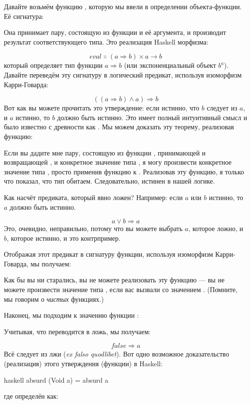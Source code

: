 Давайте возьмём функцию , которую мы ввели в
определении объекта-функции. Её сигнатура:

Она принимает пару, состоящую из функции и её аргумента, и производит
результат соответствующего типа. Это реализация Haskell
морфизма:

\[\mathit{eval} \Colon (a \Rightarrow b) \times a \to b\]
который определяет тип функции $a \Rightarrow b$ (или экспоненциальный объект
$b^{a}$). Давайте переведём эту сигнатуру в логический предикат,
используя изоморфизм Карри-Говарда:

\[((a \Rightarrow b) \wedge a) \Rightarrow b\]
Вот как вы можете прочитать это утверждение: если истинно, что $b$
следует из $a$, и $a$ истинно, то $b$ должно быть
истинно. Это имеет полный интуитивный смысл и было известно с
древности как . Мы можем доказать эту теорему,
реализовав функцию:

Если вы дадите мне пару, состоящую из функции , принимающей
 и возвращающей , и конкретное значение 
типа , я могу произвести конкретное значение типа ,
просто применив функцию  к . Реализовав
эту функцию, я только что показал, что тип
 обитаем.
Следовательно,  истинен в нашей логике.

Как насчёт предиката, который явно ложен? Например: если
$a$ или $b$ истинно, то $a$ должно быть истинно.

\[a \vee b \Rightarrow a\]
Это, очевидно, неправильно, потому что вы можете выбрать $a$, которое
ложно, и $b$, которое истинно, и это контрпример.

Отображая этот предикат в сигнатуру функции, используя изоморфизм Карри-Говарда,
мы получаем:

Как бы вы ни старались, вы не можете реализовать эту функцию --- вы не можете произвести
значение типа , если вас вызвали со значением .
(Помните, мы говорим о \emph{чистых} функциях.)

Наконец, мы подходим к значению функции :

Учитывая, что  переводится в ложь, мы получаем:

\[\mathit{false} \Rightarrow a\]
Всё следует из лжи (\emph{ex falso quodlibet}). Вот одно
возможное доказательство (реализация) этого утверждения (функции) в Haskell:

\begin{snip}{haskell}
absurd (Void a) = absurd a
\end{snip}
где  определён как:

